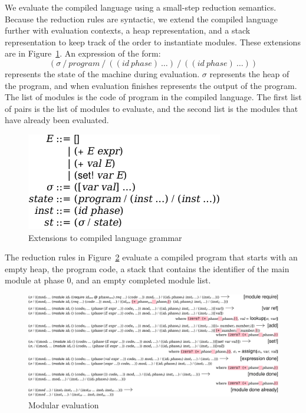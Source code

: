 We evaluate the compiled language using a small-step reduction semantics. 
Because the reduction rules are syntactic, we extend the compiled language further with evaluation contexts, a heap representation, and a stack representation to keep track of the order to instantiate modules.
These extensions are in Figure~\ref{fig:compiled-eval-lang}.
An expression of the form:
\[
  (\sigma\ /\ program\ /\ ((id\ phase)\ \ldots)\ /\ ((id\ phase)\ \ldots))
\]
represents the state of the machine during evaluation.
$\sigma$ represents the heap of the program, and when evaluation finishes represents the output of the program.
The list of modules is the code of program in the compiled language.
The first list of  pairs is the list of modules to evaluate, and the second list is the modules that have already been evaluated.

\begin{figure}[h]
\includegraphics{figures/compiled-eval-lang}
\caption{Extensions to compiled language grammar}
\label{fig:compiled-eval-lang}
\end{figure}

The reduction rules in Figure~\ref{fig:eval-reduction} evaluate a compiled program that starts with an empty heap, the program code, a stack that contains the identifier of the main module at phase 0, and an empty completed module list. 

\begin{figure}[h]
\includegraphics[width=\textwidth]{figures/eval-reduction}
\caption{Modular evaluation}
\label{fig:eval-reduction}
\end{figure}

